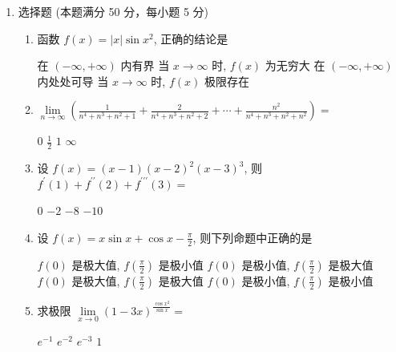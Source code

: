 

\begin{enumerate}
	\item
	选择题 (本题满分 50 分，每小题 5 分)
\begin{enumerate}
	\item
	函数 $f(x)=|x| \sin x^{2}$, 正确的结论是 





\fourchoices
{在 $(-\infty,+\infty)$ 内有界}
{当 $x \rightarrow \infty$ 时, $f(x)$ 为无穷大}
{在 $(-\infty,+\infty)$ 内处处可导}
{当 $x \rightarrow \infty$ 时, $f(x)$ 极限存在}


\item
$ \lim\limits _{n \rightarrow \infty}\left(\frac{1}{n^{4}+n^{3}+n^{2}+1}+\frac{2}{n^{4}+n^{3}+n^{2}+2}+\cdots+\frac{n^{2}}{n^{4}+n^{3}+n^{2}+n^{2}}\right)= $ 


\fourchoices
{$ 0 $}
{$\frac{1}{2}$}
{$ 1 $}
{$\infty$}

\item
设 $f(x)=(x-1)(x-2)^{2}(x-3)^{3}$, 则 $f^{\prime}(1)+f^{\prime \prime}(2)+f^{\prime \prime \prime}(3)=$ 


\fourchoices
{$ 0 $}
{$-2$}
{$-8$}
{$-10$}

\item
设 $f(x)=x \sin x+\cos x-\frac{\pi}{2}$, 则下列命题中正确的是 


\fourchoices
{$f(0)$ 是极大值, $f\left(\frac{\pi}{2}\right)$ 是极小值}
{$f(0)$ 是极小值, $f\left(\frac{\pi}{2}\right)$ 是极大值}
{$f(0)$ 是极大值, $f\left(\frac{\pi}{2}\right)$ 是极大值}
{$f(0)$ 是极小值, $f\left(\frac{\pi}{2}\right)$ 是极小值}


\item
求极限 $\lim\limits _{x \rightarrow 0}(1-3 x)^{\frac{\cos x^{2}}{\sin x}}=$ 


\fourchoices
{$e^{-1}$}
{$e^{-2}$}
{$e^{-3}$}
{$ 1 $}


\end{enumerate}
\end{enumerate}
